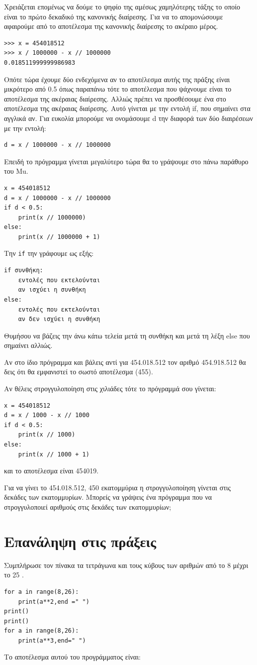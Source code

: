 Χρειάζεται επομένως να δούμε το ψηφίο της αμέσως χαμηλότερης τάξης το οποίο είναι το πρώτο δεκαδικό της κανονικής διαίρεσης. Για να το απομονώσουμε αφαιρούμε από το αποτέλεσμα της κανονικής διαίρεσης το ακέραιο μέρος.
\begin{lstlisting}
>>> x = 454018512
>>> x / 1000000 - x // 1000000
0.018511999999986983
\end{lstlisting}
Οπότε τώρα έχουμε δύο ενδεχόμενα αν το αποτέλεσμα αυτής της πράξης είναι μικρότερο από 0.5 όπως παραπάνω τότε το αποτέλεσμα που ψάχνουμε είναι το αποτέλεσμα της ακέραιας διαίρεσης. Αλλιώς πρέπει να προσθέσουμε ένα στο αποτέλεσμα της ακέραιας διαίρεσης.
Αυτό γίνεται με την εντολή if, που σημαίνει στα αγγλικά αν. Για ευκολία μπορούμε να ονομάσουμε d την διαφορά των δύο διαιρέσεων με την εντολή:
\begin{lstlisting}
d = x / 1000000 - x // 1000000
\end{lstlisting}
Επειδή το πρόγραμμα γίνεται μεγαλύτερο τώρα θα το γράψουμε στο πάνω παράθυρο του Mu.
\begin{lstlisting}
x = 454018512
d = x / 1000000 - x // 1000000
if d < 0.5:
    print(x // 1000000)
else:
    print(x // 1000000 + 1)
\end{lstlisting}
Την \lstinline{if} την γράφουμε ως εξής:
\begin{lstlisting}
if συνθήκη:
    εντολές που εκτελούνται
    αν ισχύει η συνθήκη
else:
    εντολές που εκτελούνται
    αν δεν ισχύει η συνθήκη
\end{lstlisting}
Θυμήσου να βάζεις την άνω κάτω τελεία μετά τη συνθήκη και μετά τη λέξη else που σημαίνει αλλιώς.

Αν στο ίδιο πρόγραμμα και βάλεις αντί για 454.018.512 τον αριθμό 454.918.512 θα δεις ότι θα εμφανιστεί το σωστό αποτέλεσμα (455).

Αν θέλεις στρογγυλοποίηση στις χιλιάδες τότε το πρόγραμμά σου γίνεται:
\begin{lstlisting}
x = 454018512
d = x / 1000 - x // 1000
if d < 0.5:
    print(x // 1000)
else:
    print(x // 1000 + 1)
\end{lstlisting}
και το αποτέλεσμα είναι 454019.

\begin{exercise}
Για να γίνει το 454.018.512, 450 εκατομμύρια  η στρογγυλοποίηση γίνεται στις δεκάδες των εκατομμυρίων. Μπορείς να γράψεις ένα πρόγραμμα που να στρογγυλοποιεί αριθμούς στις δεκάδες των εκατομμυρίων;
\end{exercise}

\section{Επανάληψη στις πράξεις}
\begin{exercise}
Συμπλήρωσε τον πίνακα τα τετράγωνα και τους κύβους των αριθμών από το 8 μέχρι το 25 .
\end{exercise}
\begin{lstlisting}
for a in range(8,26):
    print(a**2,end =" ")
print()
print()
for a in range(8,26):
    print(a**3,end=" ")
\end{lstlisting}
Το αποτέλεσμα αυτού του προγράμματος είναι:

